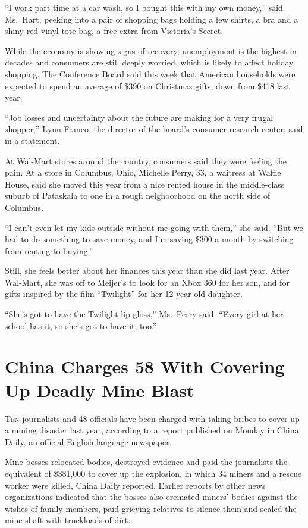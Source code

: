 ﻿\documentclass[12pt]{article}
\begin{document}
``I work part time at a car wash, so I bought this with my own money,'' said Ms.~Hart, peeking into
a pair of shopping bags holding a few shirts, a bra and a shiny red vinyl tote bag, a free extra
from Victoria's Secret.

While the economy is showing signs of recovery, unemployment is the highest in decades and consumers
are still deeply worried, which is likely to affect holiday shopping. The Conference Board said this
week that American households were expected to spend an average of \$390 on Christmas gifts, down
from \$418 last year.

``Job losses and uncertainty about the future are making for a very frugal shopper,'' Lynn Franco,
the director of the board's consumer research center, said in a statement.

At Wal-Mart stores around the country, consumers said they were feeling the pain. At a store in
Columbus, Ohio, Michelle Perry, 33, a waitress at Waffle House, said she moved this year from a nice
rented house in the middle-class suburb of Pataskala to one in a rough neighborhood on the north
side of Columbus.

``I can't even let my kids outside without me going with them,'' she said. ``But we had to do
something to save money, and I'm saving \$300 a month by switching from renting to buying.''

Still, she feels better about her finances this year than she did last year. After Wal-Mart, she was
off to Meijer's to look for an Xbox 360 for her son, and for gifts inspired by the film ``Twilight''
for her 12-year-old daughter.

``She's got to have the Twilight lip gloss,'' Ms.~Perry said. ``Every girl at her school has it, so
she's got to have it, too.''

\section{China Charges 58 With Covering Up Deadly Mine Blast}

\lettrine{T}{en} journalists and 48 officials have been charged with taking
bribes to cover up a mining disaster last year, according to a report published on Monday in China
Daily, an official English-language newspaper.

Mine bosses relocated bodies, destroyed evidence and paid the journalists the equivalent of
\$381,000 to cover up the explosion, in which 34 miners and a rescue worker were killed, China Daily
reported. Earlier reports by other news organizations indicated that the bosses also cremated
miners' bodies against the wishes of family members, paid grieving relatives to silence them and
sealed the mine shaft with truckloads of dirt.
\end{document}
